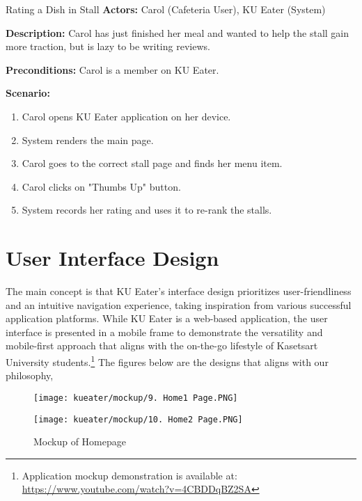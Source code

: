 \begin{usecase}{Rating a Dish in Stall}
    \textbf{Actors:} Carol (Cafeteria User), KU Eater (System)

    \textbf{Description:} Carol has just finished her meal and wanted to help the stall gain more traction, but is lazy to be writing reviews.

    \textbf{Preconditions:} Carol is a member on KU Eater.

    \textbf{Scenario:}

    \begin{enumerate}[leftmargin=80pt]
        \item Carol opens KU Eater application on her device.
        \item System renders the main page.
        \item Carol goes to the correct stall page and finds her menu item.
        \item Carol clicks on "Thumbs Up" button.
        \item System records her rating and uses it to re-rank the stalls.
    \end{enumerate}
\end{usecase}


\newpage

\section{User Interface Design}
\label{section:user-interface-design}

The main concept is that KU Eater's interface design prioritizes user-friendliness and an intuitive navigation experience,
taking inspiration from various successful application platforms. While KU Eater is a web-based application,
the user interface is presented in a mobile frame to demonstrate the versatility and mobile-first approach that aligns with
the on-the-go lifestyle of Kasetsart University students.\footnote{Application mockup demonstration is available at: \url{https://www.youtube.com/watch?v=4CBDDqBZ2SA}}
The figures below are the designs that aligns with our philosophy,


\begin{figure}[h!]
    \begin{minipage}{.5\textwidth}
        \centering
        \texttt{[image: kueater/mockup/9. Home1 Page.PNG]}
    \end{minipage}%
    \begin{minipage}{.5\textwidth}
        \centering
        \texttt{[image: kueater/mockup/10. Home2 Page.PNG]}
    \end{minipage}
    \caption{Mockup of Homepage}
    \vspace*{-\baselineskip}
\end{figure}

